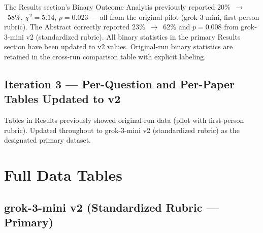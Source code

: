 \documentclass[12pt, letterpaper]{article}
\begin{document}
The Results section's Binary Outcome Analysis previously reported 20\%~$\to$~58\%,
$\chi^2 = 5.14$, $p = 0.023$ --- all from the original pilot (grok-3-mini, first-person
rubric). The Abstract correctly reported 23\%~$\to$~62\% and $p = 0.008$ from
grok-3-mini v2 (standardized rubric). All binary statistics in the primary Results
section have been updated to v2 values. Original-run binary statistics are retained in
the cross-run comparison table with explicit labeling.

\subsection*{Iteration 3 --- Per-Question and Per-Paper Tables Updated to v2}

Tables in Results previously showed original-run data (pilot with first-person rubric).
Updated throughout to grok-3-mini v2 (standardized rubric) as the designated primary
dataset.

\section{Full Data Tables}
\label{app:data}

\subsection*{grok-3-mini v2 (Standardized Rubric --- Primary)}
\end{document}
